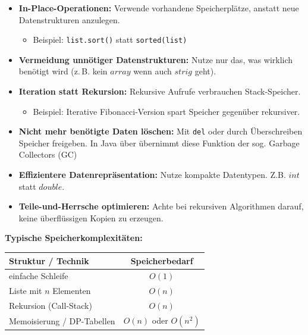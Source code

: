 \documentclass[a4paper,12pt]{article}
\begin{document}
		\begin{itemize}
			\item \textbf{In-Place-Operationen:} Verwende vorhandene Speicherplätze, anstatt neue Datenstrukturen anzulegen.
			\begin{itemize}
				\item Beispiel: \texttt{list.sort()} statt \texttt{sorted(list)}
			\end{itemize}
			
			\item \textbf{Vermeidung unnötiger Datenstrukturen:} Nutze nur das, was wirklich benötigt wird (z.\,B. kein $array$ wenn auch $strig$ geht).
			
			\item \textbf{Iteration statt Rekursion:} Rekursive Aufrufe verbrauchen Stack-Speicher.
			\begin{itemize}
				\item Beispiel: Iterative Fibonacci-Version spart Speicher gegenüber rekursiver.
			\end{itemize}
			
			\item \textbf{Nicht mehr benötigte Daten löschen:} Mit \texttt{del} oder durch Überschreiben Speicher freigeben. In Java über übernimmt diese Funktion der sog. Garbage Collectors (GC)
			
			\item \textbf{Effizientere Datenrepräsentation:} Nutze kompakte Datentypen. Z.B. $int$ statt $double$.
			
			\item \textbf{Teile-und-Herrsche optimieren:} Achte bei rekursiven Algorithmen darauf, keine überflüssigen Kopien zu erzeugen.
		\end{itemize}
		
		\vspace{1em}
		\textbf{Typische Speicherkomplexitäten:}
		
		\begin{center}
			\begin{tabular}{|l|c|}
				\hline
				\textbf{Struktur / Technik} & \textbf{Speicherbedarf} \\
				\hline
				einfache Schleife & \( O(1) \) \\
				Liste mit \( n \) Elementen & \( O(n) \) \\
				Rekursion (Call-Stack) & \( O(n) \) \\
				Memoisierung / DP-Tabellen & \( O(n) \) oder \( O(n^2) \) \\
				\hline
			\end{tabular}
		\end{center}
		
\end{document}
